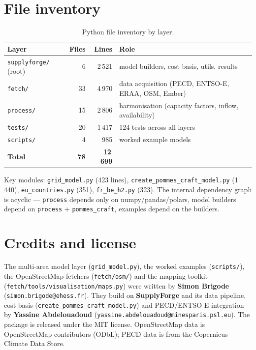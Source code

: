 \documentclass[11pt,a4paper]{article}
\begin{document}
\section{File inventory}
\begin{table}[ht]
\centering
\caption{Python file inventory by layer.}
\label{tab:inv}
\small
\begin{tabular}{@{}lrrl@{}}
\toprule
\textbf{Layer} & \textbf{Files} & \textbf{Lines} & \textbf{Role} \\
\midrule
\texttt{supplyforge/} (root) & 6  & 2\,521 & model builders, cost basis, utils, results \\
\texttt{fetch/}              & 33 & 4\,970 & data acquisition (PECD, ENTSO-E, ERAA, OSM, Ember) \\
\texttt{process/}            & 15 & 2\,806 & harmonisation (capacity factors, inflow, availability) \\
\texttt{tests/}              & 20 & 1\,417 & 124 tests across all layers \\
\texttt{scripts/}            & 4  & 985    & worked example models \\
\midrule
\textbf{Total}               & \textbf{78} & \textbf{12\,699} & \\
\bottomrule
\end{tabular}
\end{table}

Key modules: \texttt{grid\_model.py} (423 lines), \texttt{create\_pommes\_craft\_model.py}
(1\,440), \texttt{eu\_countries.py} (351), \texttt{fr\_be\_h2.py} (323). The internal dependency graph
is acyclic --- \texttt{process} depends only on numpy/pandas/polars, model builders depend on
\texttt{process} + \texttt{pommes\_craft}, examples depend on the builders.

\section{Credits and license}
The multi-area model layer (\texttt{grid\_model.py}), the worked examples (\texttt{scripts/}), the
OpenStreetMap fetchers (\texttt{fetch/osm/}) and the mapping toolkit
(\texttt{fetch/tools/visualisation/maps.py}) were written by \textbf{Simon Brigode}
(\texttt{simon.brigode@ehess.fr}). They build on \textbf{SupplyForge} and its data pipeline, cost
basis (\texttt{create\_pommes\_craft\_model.py}) and PECD/ENTSO-E integration by \textbf{Yassine
Abdelouadoud} (\texttt{yassine.abdelouadoud@minesparis.psl.eu}). The package is released under the MIT
license. OpenStreetMap data is \textcopyright{} OpenStreetMap contributors (ODbL); PECD data is from the
Copernicus Climate Data Store.
\end{document}
